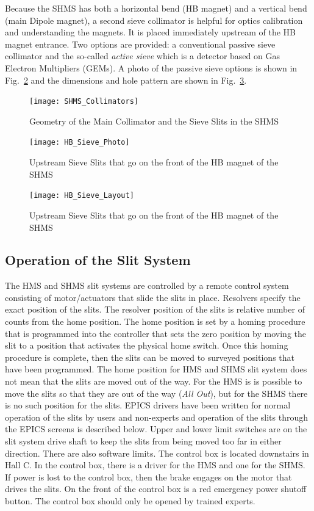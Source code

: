 Because the SHMS has both a horizontal bend (HB magnet) and a vertical bend (main Dipole
magnet), a second sieve collimator is helpful for optics calibration and understanding the magnets. 
It is placed immediately
upstream of the HB magnet entrance. Two options are provided: a conventional passive
sieve collimator and the so-called \textit{active sieve} which is a detector based on Gas Electron 
Multipliers (GEMs).  A photo of the passive sieve options is shown in Fig.~\ref{fig:HB_Sieve_Photo}
and the dimensions and hole pattern are shown in Fig.~\ref{fig:HB_Sieve_Layout}.

\begin{figure}
\begin{center}
\texttt{[image: SHMS\_Collimators]}
\caption{Geometry of the Main Collimator and the Sieve Slits in the SHMS \label{fig:SHMS_Collimators}}
\end{center}
\end{figure}

\begin{figure}
\texttt{[image: HB\_Sieve\_Photo]}
\caption{Upstream Sieve Slits that go on the front of the HB magnet of the SHMS \label{fig:HB_Sieve_Photo}}
\end{figure}

\begin{figure}
\texttt{[image: HB\_Sieve\_Layout]}
\caption{Upstream Sieve Slits that go on the front of the HB magnet of the SHMS \label{fig:HB_Sieve_Layout}}
\end{figure}

\subsection{Operation of the Slit System}\label{sssec:slit_control}
The HMS and SHMS slit systems are controlled by a remote control system consisting of 
motor/actuators that slide the slits in place. Resolvers specify the exact position of the slits.
The resolver position of the slits is relative number of counts from the home position. The home position
is set by a homing procedure that is programmed into the controller that sets the zero position by moving the
slit to a position that activates the physical home switch. Once this homing procedure is complete, then
the slits can be moved to surveyed positions that have been programmed. The home position for HMS and SHMS slit system
does not mean that the slits are moved out of the way. For the HMS is is possible to move the slits so that
they are out of the way ({\it All Out}), but for the SHMS there is no such position for the slits. 
EPICS drivers have been written for 
normal operation of the slits by users and non-experts and operation of the slits through the EPICS 
screens is described below. Upper and lower limit switches are on the slit system drive shaft to keep the
slits from being moved too far in either direction. There are also software limits.
The control box is located downstairs in Hall C. In the control box, there is a driver 
for the HMS and one for the SHMS. If power is lost to the control box, then the brake engages
on the motor that drives the slits. On the front of the control box is 
a red  emergency power shutoff button. The control box should only be opened by trained experts.

